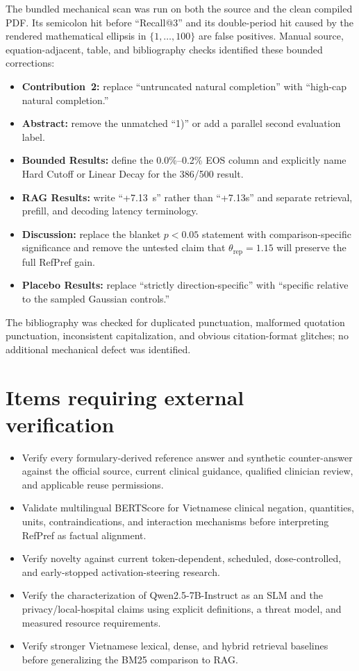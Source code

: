 \documentclass[11pt]{article}
\begin{document}
The bundled mechanical scan was run on both the source and the clean compiled PDF.  Its semicolon hit before ``Recall@3'' and its double-period hit caused by the rendered mathematical ellipsis in $\{1,\ldots,100\}$ are false positives.  Manual source, equation-adjacent, table, and bibliography checks identified these bounded corrections:

\begin{itemize}
    \item \textbf{Contribution~2:} replace ``untruncated natural completion'' with ``high-cap natural completion.''
    \item \textbf{Abstract:} remove the unmatched ``1)'' or add a parallel second evaluation label.
    \item \textbf{Bounded Results:} define the 0.0\%--0.2\% EOS column and explicitly name Hard Cutoff or Linear Decay for the 386/500 result.
    \item \textbf{RAG Results:} write ``+7.13~s'' rather than ``+7.13s'' and separate retrieval, prefill, and decoding latency terminology.
    \item \textbf{Discussion:} replace the blanket $p<0.05$ statement with comparison-specific significance and remove the untested claim that $\theta_{\text{rep}}=1.15$ will preserve the full RefPref gain.
    \item \textbf{Placebo Results:} replace ``strictly direction-specific'' with ``specific relative to the sampled Gaussian controls.''
\end{itemize}

The bibliography was checked for duplicated punctuation, malformed quotation punctuation, inconsistent capitalization, and obvious citation-format glitches; no additional mechanical defect was identified.

\section*{Items requiring external verification}

\begin{itemize}
    \item Verify every formulary-derived reference answer and synthetic counter-answer against the official source, current clinical guidance, qualified clinician review, and applicable reuse permissions.
    \item Validate multilingual BERTScore for Vietnamese clinical negation, quantities, units, contraindications, and interaction mechanisms before interpreting RefPref as factual alignment.
    \item Verify novelty against current token-dependent, scheduled, dose-controlled, and early-stopped activation-steering research.
    \item Verify the characterization of Qwen2.5-7B-Instruct as an SLM and the privacy/local-hospital claims using explicit definitions, a threat model, and measured resource requirements.
    \item Verify stronger Vietnamese lexical, dense, and hybrid retrieval baselines before generalizing the BM25 comparison to RAG.
\end{itemize}
\end{document}
